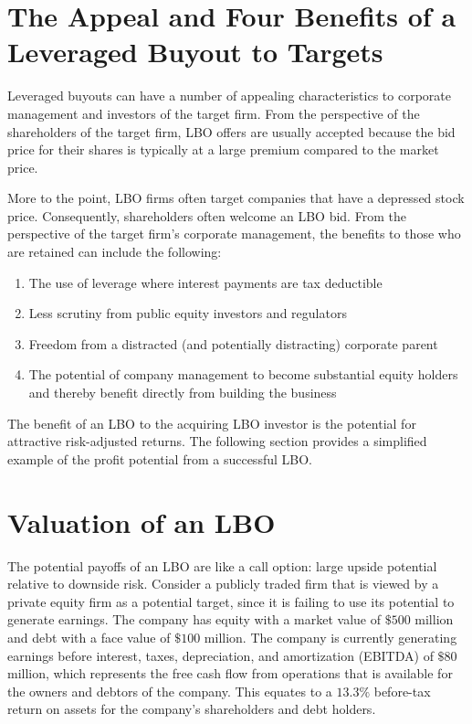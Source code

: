 \documentclass[11pt]{article}
\begin{document}
\section*{The Appeal and Four Benefits of a Leveraged Buyout to Targets}
Leveraged buyouts can have a number of appealing characteristics to corporate management and investors of the target firm. From the perspective of the shareholders of the target firm, LBO offers are usually accepted because the bid price for their shares is typically at a large premium compared to the market price.

More to the point, LBO firms often target companies that have a depressed stock price. Consequently, shareholders often welcome an LBO bid. From the perspective of the target firm's corporate management, the benefits to those who are retained can include the following:

\begin{enumerate}
  \item The use of leverage where interest payments are tax deductible

  \item Less scrutiny from public equity investors and regulators

  \item Freedom from a distracted (and potentially distracting) corporate parent

  \item The potential of company management to become substantial equity holders and thereby benefit directly from building the business

\end{enumerate}

The benefit of an LBO to the acquiring LBO investor is the potential for attractive risk-adjusted returns. The following section provides a simplified example of the profit potential from a successful LBO.

\section*{Valuation of an LBO}
The potential payoffs of an LBO are like a call option: large upside potential relative to downside risk. Consider a publicly traded firm that is viewed by a private equity firm as a potential target, since it is failing to use its potential to generate earnings. The company has equity with a market value of $\$ 500$ million and debt with a face value of $\$ 100$ million. The company is currently generating earnings before interest, taxes, depreciation, and amortization (EBITDA) of $\$ 80$ million, which represents the free cash flow from operations that is available for the owners and debtors of the company. This equates to a $13.3 \%$ before-tax return on assets for the company's shareholders and debt holders.
\end{document}
